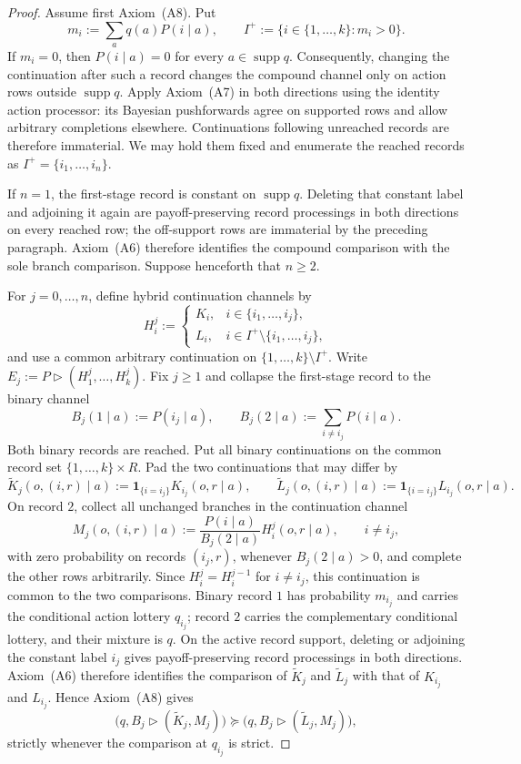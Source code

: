 \documentclass[11pt,a4paper]{article}
\theoremstyle{definition}
\newcommand{\supp}{\operatorname{supp}}
\newcommand{\1}{\mathbf 1}
\begin{document}
\begin{proof}
Assume first Axiom~\textup{(A8)}.  Put
\[
 m_i:=\sum_aq(a)P(i\mid a),
 \qquad
 I^+:=\{i\in\{1,\ldots,k\}:m_i>0\}.
\]
If $m_i=0$, then $P(i\mid a)=0$ for every $a\in\supp q$.  Consequently, changing the continuation after such a
record changes the compound channel only on action rows outside $\supp q$.  Apply Axiom~\textup{(A7)} in both
directions using the identity action processor: its Bayesian pushforwards agree on supported rows and allow
arbitrary completions elsewhere.  Continuations following unreached records are therefore immaterial.  We may
hold them fixed and enumerate the reached records as $I^+=\{i_1,\ldots,i_n\}$.

If $n=1$, the first-stage record is constant on $\supp q$.  Deleting that
constant label and adjoining it again are payoff-preserving record processings
in both directions on every reached row; the off-support rows are immaterial
by the preceding paragraph.  Axiom~\textup{(A6)} therefore identifies the
compound comparison with the sole branch comparison.  Suppose henceforth that
$n\ge2$.

For $j=0,\ldots,n$, define hybrid continuation channels by
\[
 H_i^j:=
 \begin{cases}
 K_i,&i\in\{i_1,\ldots,i_j\},\\
 L_i,&i\in I^+\setminus\{i_1,\ldots,i_j\},
 \end{cases}
\]
and use a common arbitrary continuation on $\{1,\ldots,k\}\setminus I^+$.  Write
$E_j:=P\triangleright(H_1^j,\ldots,H_k^j)$.  Fix $j\ge1$ and collapse the first-stage record to the binary channel
\[
 B_j(1\mid a):=P(i_j\mid a),
 \qquad
 B_j(2\mid a):=\sum_{i\ne i_j}P(i\mid a).
\]
Both binary records are reached.  Put all binary continuations on the common record set
$\{1,\ldots,k\}\times R$.  Pad the
two continuations that may differ by
\[
 \widetilde K_j(o,(i,r)\mid a):=\1_{\{i=i_j\}}K_{i_j}(o,r\mid a),
 \qquad
 \widetilde L_j(o,(i,r)\mid a):=\1_{\{i=i_j\}}L_{i_j}(o,r\mid a).
\]
On record $2$, collect all unchanged branches in the continuation channel
\begin{equation}
 M_j(o,(i,r)\mid a)
 :=\frac{P(i\mid a)}{B_j(2\mid a)}H_i^j(o,r\mid a),
 \qquad i\ne i_j,
 \label{pt:eq:complement-continuation}
\end{equation}
with zero probability on records $(i_j,r)$, whenever $B_j(2\mid a)>0$, and complete the other rows arbitrarily.
Since $H_i^j=H_i^{j-1}$ for $i\ne i_j$, this continuation is common to the two comparisons.
Binary record $1$ has probability
$m_{i_j}$ and carries the conditional action lottery $q_{i_j}$; record $2$ carries the complementary conditional
lottery, and their mixture is $q$.  On the active record support, deleting or
adjoining the constant label $i_j$ gives payoff-preserving record processings
in both directions.  Axiom~\textup{(A6)} therefore identifies the comparison
of $\widetilde K_j$ and $\widetilde L_j$ with that of $K_{i_j}$ and $L_{i_j}$.
Hence Axiom~\textup{(A8)} gives
\[
 \bigl(q,B_j\triangleright(\widetilde K_j,M_j)\bigr)
 \succeq
 \bigl(q,B_j\triangleright(\widetilde L_j,M_j)\bigr),
\]
strictly whenever the comparison at $q_{i_j}$ is strict.


\end{proof}
\end{document}
